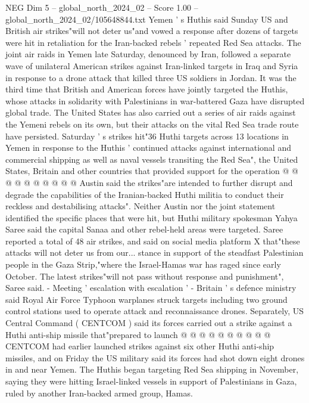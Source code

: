 \begin{textsample}{NEG Dim 5 – global\_north\_2024\_02 – Score 1.00 – global\_north\_2024\_02/105648844.txt}  \label{ex:f5_neg_218}
Yemen ' s Huthis said Sunday US and British air strikes"will not deter us"and vowed a response after dozens of targets were hit in retaliation for the Iran-backed rebels ' repeated Red Sea attacks.
The joint air raids in Yemen late Saturday, denounced by Iran, followed a separate wave of unilateral American strikes against Iran-linked targets in Iraq and Syria in response to a drone attack that killed three US soldiers in Jordan.
It was the third time that British and American forces have jointly targeted the Huthis, whose attacks in solidarity with Palestinians in war-battered Gaza have disrupted global trade.
The United States has also carried out a series of air raids against the Yemeni rebels on its own, but their attacks on the vital Red Sea trade route have persisted.
Saturday ' s strikes hit"36 Huthi targets across 13 locations in Yemen in response to the Huthis ' continued attacks against international and commercial shipping as well as naval vessels transiting the Red Sea", the United States, Britain and other countries that provided support for the operation @ @ @ @ @ @ @ @ @ @ Austin said the strikes"are intended to further disrupt and degrade the capabilities of the Iranian-backed Huthi militia to conduct their reckless and destabilising attacks".
Neither Austin nor the joint statement identified the specific places that were hit, but Huthi military spokesman Yahya Saree said the capital Sanaa and other rebel-held areas were targeted.
Saree reported a total of 48 air strikes, and said on social media platform X that"these attacks will not deter us from our... stance in support of the steadfast Palestinian people in the Gaza Strip,"where the Israel-Hamas war has raged since early October.
The latest strikes"will not pass without response and punishment", Saree said. - Meeting ' escalation with escalation ' - Britain ' s defence ministry said Royal Air Force Typhoon warplanes struck targets including two ground control stations used to operate attack and reconnaissance drones.
Separately, US Central Command ( CENTCOM ) said its forces carried out a strike against a Huthi anti-ship missile that"prepared to launch @ @ @ @ @ @ @ @ @ @ CENTCOM had earlier launched strikes against six other Huthi anti-ship missiles, and on Friday the US military said its forces had shot down eight drones in and near Yemen.
The Huthis began targeting Red Sea shipping in November, saying they were hitting Israel-linked vessels in support of Palestinians in Gaza, ruled by another Iran-backed armed group, Hamas.

\end{textsample}

